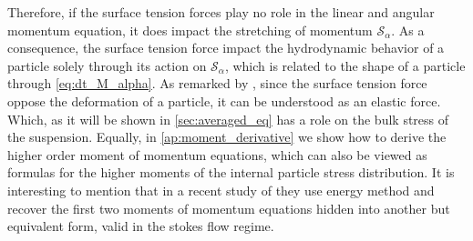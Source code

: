 Therefore, if the surface tension forces play no role in the linear and angular momentum equation, it does impact the stretching of momentum $\mathcal{S}_\alpha$.
As a consequence, the surface tension force impact the hydrodynamic behavior of a particle solely through its action on $\mathcal{S}_\alpha$, which is related to the shape of a particle through \ref{eq:dt_M_alpha}.
As remarked by \citet{batchelor1970stress}, since the surface tension force oppose the deformation of a particle, it can be understood as an elastic force. 
Which, as it will be shown in \ref{sec:averaged_eq} has a role on the bulk stress of the suspension. 
Equally, in \ref{ap:moment_derivative} we show how to derive the higher order moment of momentum equations, which can also be viewed as formulas for the higher moments of the internal particle stress distribution. 
It is interesting to mention that in a recent study of \citet{dolata2021faxen} they use energy method and recover the first two moments of momentum equations hidden into another but equivalent form, valid in the stokes flow regime. 


